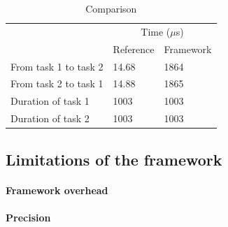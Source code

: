 \begin{table}[!ht]
  \centering
  \begin{tabular}{lll}
                        & \multicolumn{2}{c}{Time ($\mu$s)}                                     \\ \cline{2-3} 
                        & \multicolumn{1}{c}{Reference} & Framework \\ \cline{2-3} 
  From task 1 to task 2 & 14.68                                     & 1864                  \\
  From task 2 to task 1 & 14.88                                     & 1865                  \\
  Duration of task 1    & 1003                                      & 1003                  \\
  Duration of task 2    & 1003                                      & 1003                 
  \end{tabular}
  \caption{Comparison}
  \label{tab:measurements-comparison}
\end{table}


\subsection{Limitations of the framework}

\paragraph{Framework overhead}

\paragraph{Precision}